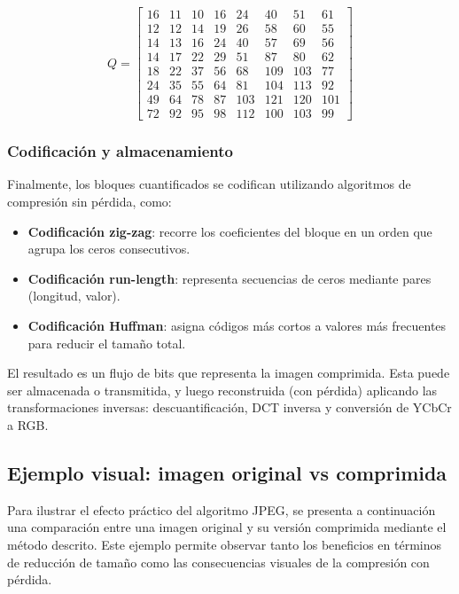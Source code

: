 \documentclass[8pt,a4paper]{article}
\theoremstyle{definition}
\theoremstyle{remark}
\begin{document}
\begin{multicols}{2}
            \label{matriz:Q}
            
            \[
            Q =
            \begin{bmatrix}
            16&11&10&16&24&40&51&61\\
            12&12&14&19&26&58&60&55\\
            14&13&16&24&40&57&69&56\\
            14&17&22&29&51&87&80&62\\
            18&22&37&56&68&109&103&77\\
            24&35&55&64&81&104&113&92\\
            49&64&78&87&103&121&120&101\\
            72&92&95&98&112&100&103&99
            \end{bmatrix}
            \]
            
            \subsubsection{Codificación y almacenamiento}
            Finalmente, los bloques cuantificados se codifican utilizando algoritmos de compresión sin pérdida, como:
            \begin{itemize}[noitemsep, topsep=0pt, left=10pt]
                \item \textbf{Codificación zig-zag}: recorre los coeficientes del bloque en un orden que agrupa los ceros consecutivos.
                \item \textbf{Codificación run-length}: representa secuencias de ceros mediante pares (longitud, valor).
                \item \textbf{Codificación Huffman}: asigna códigos más cortos a valores más frecuentes para reducir el tamaño total.
            \end{itemize}
            El resultado es un flujo de bits que representa la imagen comprimida. Esta puede ser almacenada o transmitida, y luego reconstruida (con pérdida) aplicando las transformaciones inversas: descuantificación, DCT inversa y conversión de YCbCr a RGB.
            \subsection{Ejemplo visual: imagen original vs comprimida}
            Para ilustrar el efecto práctico del algoritmo JPEG, se presenta a continuación una comparación entre una imagen original y su versión comprimida mediante el método descrito. Este ejemplo permite observar tanto los beneficios en términos de reducción de tamaño como las consecuencias visuales de la compresión con pérdida.


\end{multicols}
\end{document}
